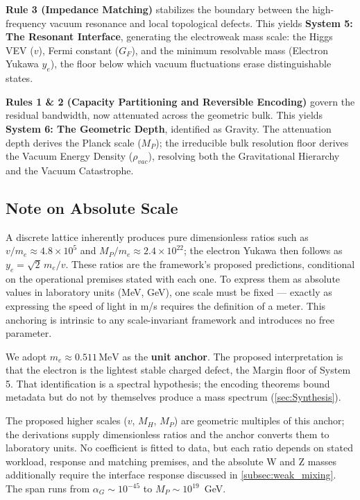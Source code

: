 \textbf{Rule 3 (Impedance Matching)} stabilizes the boundary between the high-frequency vacuum resonance and local topological defects. This yields \textbf{System 5: The Resonant Interface}, generating the electroweak mass scale: the Higgs VEV ($v$), Fermi constant ($G_F$), and the minimum resolvable mass (Electron Yukawa $y_e$), the floor below which vacuum fluctuations erase distinguishable states.

\textbf{Rules 1 \& 2 (Capacity Partitioning and Reversible Encoding)} govern the residual bandwidth, now attenuated across the geometric bulk. This yields \textbf{System 6: The Geometric Depth}, identified as Gravity. The attenuation depth derives the Planck scale ($M_P$); the irreducible bulk resolution floor derives the Vacuum Energy Density ($\rho_{vac}$), resolving both the Gravitational Hierarchy and the Vacuum Catastrophe.

\subsection{Note on Absolute Scale}

A discrete lattice inherently produces pure dimensionless ratios such as $v/m_e \approx 4.8 \times 10^5$ and $M_P/m_e \approx 2.4 \times 10^{22}$; the electron Yukawa then follows as $y_e=\sqrt{2}\,m_e/v$. These ratios are the framework's proposed predictions, conditional on the operational premises stated with each one. To express them as absolute values in laboratory units (MeV, GeV), one scale must be fixed --- exactly as expressing the speed of light in m/s requires the definition of a meter. This anchoring is intrinsic to any scale-invariant framework and introduces no free parameter.

We adopt $m_e \approx 0.511\,\mathrm{MeV}$ as the \textbf{unit anchor}. The proposed interpretation is that the electron is the lightest stable charged defect, the Margin floor of System 5. That identification is a spectral hypothesis; the encoding theorems bound metadata but do not by themselves produce a mass spectrum (\cref{sec:Synthesis}).

The proposed higher scales ($v$, $M_H$, $M_P$) are geometric multiples of this anchor; the derivations supply dimensionless ratios and the anchor converts them to laboratory units. No coefficient is fitted to data, but each ratio depends on stated workload, response and matching premises, and the absolute W and Z masses additionally require the interface response discussed in \cref{subsec:weak_mixing}. The span runs from $\alpha_G\sim10^{-45}$ to $M_P\sim10^{19}$~GeV.